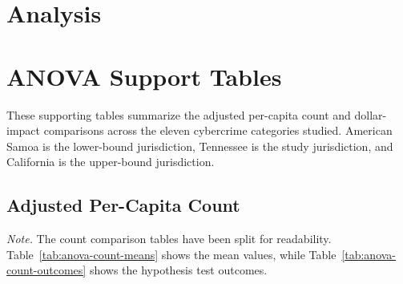 \section{Analysis}



\section{ANOVA Support Tables}

These supporting tables summarize the adjusted per-capita count and dollar-impact comparisons across the eleven cybercrime categories studied. American Samoa is the lower-bound jurisdiction, Tennessee is the study jurisdiction, and California is the upper-bound jurisdiction.

\subsection{Adjusted Per-Capita Count}

\noindent\textit{Note.} The count comparison tables have been split for readability. Table~\ref{tab:anova-count-means} shows the mean values, while Table~\ref{tab:anova-count-outcomes} shows the hypothesis test outcomes.

\begin{table}[H]
  \centering
  \caption{Adjusted per-capita count: Mean values by category.}
  \label{tab:anova-count-means}
  \small
\end{table}

